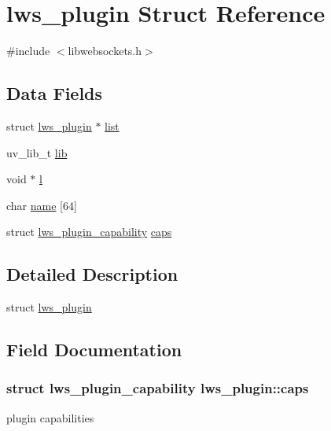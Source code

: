 \hypertarget{structlws__plugin}{}\section{lws\+\_\+plugin Struct Reference}
\label{structlws__plugin}


{\ttfamily \#include $<$libwebsockets.\+h$>$}

\subsection*{Data Fields}
\begin{DoxyCompactItemize}
\item 
struct \hyperlink{structlws__plugin}{lws\+\_\+plugin} $\ast$ \hyperlink{structlws__plugin_a65dffd68fd267ce17b988790d1d35f22}{list}
\item 
uv\+\_\+lib\+\_\+t \hyperlink{structlws__plugin_af9e1042dc1de5b9d202c2f5fd1834330}{lib}
\item 
void $\ast$ \hyperlink{structlws__plugin_a4ef37a43653715b6c69cbf8a7be747f4}{l}
\item 
char \hyperlink{structlws__plugin_af4ac8fcb79e10e0c2d960e1804d98105}{name} \mbox{[}64\mbox{]}
\item 
struct \hyperlink{structlws__plugin__capability}{lws\+\_\+plugin\+\_\+capability} \hyperlink{structlws__plugin_ac7f1fdfe8cf8a21f8ee9720c21934a3f}{caps}
\end{DoxyCompactItemize}


\subsection{Detailed Description}
struct \hyperlink{structlws__plugin}{lws\+\_\+plugin} 

\subsection{Field Documentation}
\subsubsection[{\texorpdfstring{caps}{caps}}]{\setlength{\rightskip}{0pt plus 5cm}struct {\bf lws\+\_\+plugin\+\_\+capability} lws\+\_\+plugin\+::caps}\hypertarget{structlws__plugin_ac7f1fdfe8cf8a21f8ee9720c21934a3f}{}\label{structlws__plugin_ac7f1fdfe8cf8a21f8ee9720c21934a3f}
plugin capabilities 
